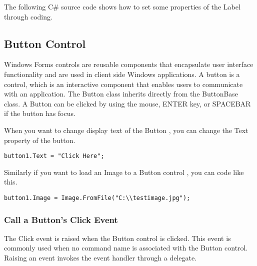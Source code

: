 The following C\# source code shows how to set some properties of the Label through coding.




\subsection{Button Control}
Windows Forms controls are reusable components that encapsulate user interface functionality and are used in client side Windows applications. A button is a control, which is an interactive component that enables users to communicate with an application. The Button class inherits directly from the ButtonBase class. A Button can be clicked by using the mouse, ENTER key, or SPACEBAR if the button has focus.


When you want to change display text of the Button , you can change the Text property of the button.

\begin{lstlisting}[numbers=none]
button1.Text = "Click Here";
\end{lstlisting}

Similarly if you want to load an Image to a Button control , you can code like this.

\begin{lstlisting}[numbers=none]
button1.Image = Image.FromFile("C:\\testimage.jpg");
\end{lstlisting}



\subsubsection*{Call a Button's Click Event}
The Click event is raised when the Button control is clicked. This event is commonly used when no command name is associated with the Button control. Raising an event invokes the event handler through a delegate.

